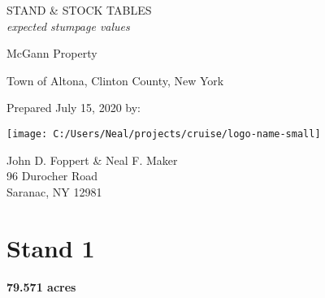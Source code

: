 \documentclass[landscape]{article}
\author{}
\date{\vspace{-2.5em}}
\begin{document}
\captionsetup[table]{labelformat=empty}
\captionsetup{justification=raggedright,singlelinecheck=false}

\vspace*{23pt}

\huge STAND \& STOCK TABLES\\
\large \emph{expected stumpage values}

\vspace{18pt}

\LARGE McGann Property

\vspace{16pt}

\Large Town of Altona, Clinton County, New York

\vspace{120pt}

\large Prepared July 15, 2020 by:

\vspace{20pt}

\texttt{[image: C:/Users/Neal/projects/cruise/logo-name-small]}

\normalsize John D. Foppert \& Neal F. Maker\\
96 Durocher Road\\
Saranac, NY 12981

\pagebreak
{}

\section{Stand 1}\label{stand-1}

\textbf{79.571 acres}
\end{document}
